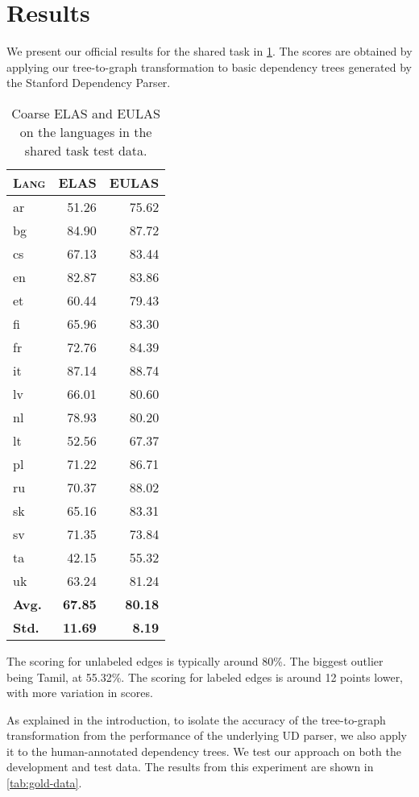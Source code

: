 \documentclass[11pt,a4paper]{article}
\begin{document}
\section{Results}
We present our official results for the shared task in
\cref{tab:test}. The scores are obtained by applying our
tree-to-graph transformation to basic dependency trees generated
by the Stanford Dependency Parser.

\begin{table}[h]
	\centering
	\begin{tabular}{l|rr}
		\textsc{Lang} & \textsc{ELAS} & \textsc{EULAS} \\
		\hline
		ar  & 51.26 & 75.62 \\
		bg  & 84.90 & 87.72\\
		cs  & 67.13 & 83.44 \\
		en  & 82.87 & 83.86 \\
		et  & 60.44 & 79.43 \\
		fi  & 65.96 & 83.30 \\
		fr  & 72.76 & 84.39 \\
		it  & 87.14 & 88.74 \\
		lv  & 66.01 & 80.60 \\
		nl  & 78.93 & 80.20 \\
		lt  & 52.56 & 67.37 \\
		pl  & 71.22 & 86.71 \\
		ru  & 70.37 & 88.02 \\
		sk  & 65.16 & 83.31 \\
		sv  & 71.35 & 73.84 \\
		ta  & 42.15 & 55.32 \\
		uk  & 63.24 & 81.24 \\
		\textbf{Avg.} & \textbf{67.85} & \textbf{80.18} \\
        \textbf{Std.} & \textbf{11.69} & \textbf{8.19} \\
	\end{tabular}
\caption{\label{tab:test} Coarse ELAS and EULAS on the languages in the shared task test data.}
\end{table}

The scoring for unlabeled edges is typically around 80\%. The biggest
outlier being Tamil, at 55.32\%. The scoring for labeled edges is
around 12 points lower, with more variation in scores.

As explained in the introduction, to isolate the accuracy of
the tree-to-graph transformation from the performance of the
underlying UD parser, we also apply it to the human-annotated
dependency trees. We test our approach on both the development and
test data. The results from this experiment are shown in
\cref{tab:gold-data}.
\end{document}
